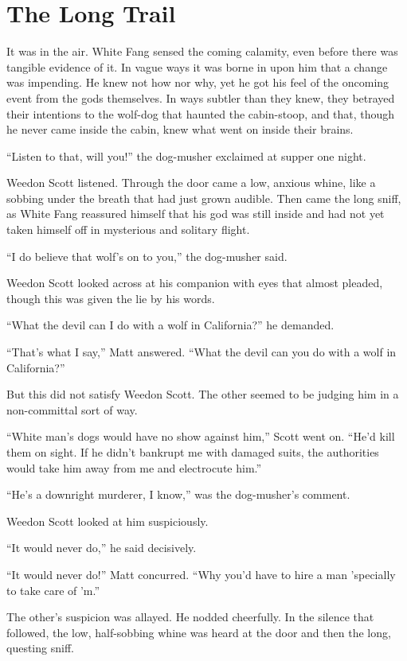 \documentclass[10pt]{book}
\begin{document}
\chapter{The Long Trail}

It was in the air. White Fang sensed the coming calamity, even before
there was tangible evidence of it. In vague ways it was borne in upon
him that a change was impending. He knew not how nor why, yet he got
his feel of the oncoming event from the gods themselves. In ways
subtler than they knew, they betrayed their intentions to the wolf-dog
that haunted the cabin-stoop, and that, though he never came inside the
cabin, knew what went on inside their brains.

“Listen to that, will you!” the dog-musher exclaimed at supper one
night.

Weedon Scott listened. Through the door came a low, anxious whine, like
a sobbing under the breath that had just grown audible. Then came the
long sniff, as White Fang reassured himself that his god was still
inside and had not yet taken himself off in mysterious and solitary
flight.

“I do believe that wolf’s on to you,” the dog-musher said.

Weedon Scott looked across at his companion with eyes that almost
pleaded, though this was given the lie by his words.

“What the devil can I do with a wolf in California?” he demanded.

“That’s what I say,” Matt answered. “What the devil can you do with a
wolf in California?”

But this did not satisfy Weedon Scott. The other seemed to be judging
him in a non-committal sort of way.

“White man’s dogs would have no show against him,” Scott went on. “He’d
kill them on sight. If he didn’t bankrupt me with damaged suits, the
authorities would take him away from me and electrocute him.”

“He’s a downright murderer, I know,” was the dog-musher’s comment.

Weedon Scott looked at him suspiciously.

“It would never do,” he said decisively.

“It would never do!” Matt concurred. “Why you’d have to hire a man
’specially to take care of ’m.”

The other’s suspicion was allayed. He nodded cheerfully. In the silence
that followed, the low, half-sobbing whine was heard at the door and
then the long, questing sniff.
\end{document}
